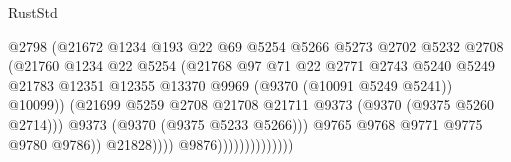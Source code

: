 \begin{lexlean}{RustStd}
\begin{coremodule}
{\begin{coremodule}
{{{{{{{{{{{{{{{{{{{{{{{{{{{{{{{{{{{{{{{                                            @2798
                                            (@21672
                                              @1234
                                              @193
                                              @22
                                              @69
                                              @5254
                                              @5266
                                              @5273
                                              @2702
                                              @5232
                                              @2708
                                              (@21760
                                                @1234
                                                @22
                                                @5254
                                                (@21768
                                                  @97
                                                  @71
                                                  @22
                                                  @2771
                                                  @2743
                                                  @5240
                                                  @5249
                                                  @21783
                                                  @12351
                                                  @12355
                                                  @13370
                                                  @9969
                                                  (@9370 (@10091 @5249 @5241))
                                                  @10099))
                                              (@21699
                                                @5259
                                                @2708
                                                @21708
                                                @21711
                                                @9373
                                                (@9370 (@9375 @5260 @2714)))
                                              @9373
                                              (@9370 (@9375 @5233 @5266)))
                                            @9765
                                            @9768
                                            @9771
                                            @9775
                                            @9780
                                            @9786))
                                        @21828))))
                                @9876))))))))))))))
}}}}}}}}}}}}}}}}}}}}}}}}}}}}}}}}}}}}}}}
\end{coremodule}}
\end{coremodule}
\end{lexlean}
